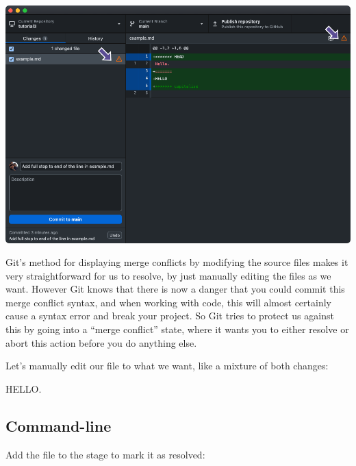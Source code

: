 \documentclass[
  letterpaper,
  DIV=11,
  numbers=noendperiod]{scrartcl}
\begin{document}
\includegraphics{images/image54.png}

Git's method for displaying merge conflicts by modifying the source
files makes it very straightforward for us to resolve, by just manually
editing the files as we want. However Git knows that there is now a
danger that you could commit this merge conflict syntax, and when
working with code, this will almost certainly cause a syntax error and
break your project. So Git tries to protect us against this by going
into a ``merge conflict'' state, where it wants you to either resolve or
abort this action before you do anything else.

Let's manually edit our file to what we want, like a mixture of both
changes:

\begin{tcolorbox}[enhanced jigsaw, rightrule=.15mm, opacitybacktitle=0.6, bottomtitle=1mm, colbacktitle=quarto-callout-note-color!10!white, toprule=.15mm, title=\textcolor{quarto-callout-note-color}{\faInfo}\hspace{0.5em}{example.md}, toptitle=1mm, left=2mm, leftrule=.75mm, titlerule=0mm, bottomrule=.15mm, colframe=quarto-callout-note-color-frame, arc=.35mm, coltitle=black, breakable, colback=white, opacityback=0]

HELLO.

\end{tcolorbox}

\subsection{Command-line}

Add the file to the stage to mark it as resolved:
\end{document}
